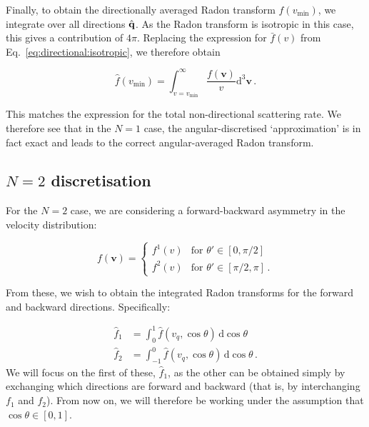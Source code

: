 Finally, to obtain the directionally averaged Radon transform $\hat{f}(v_\textrm{min})$, we integrate over all directions $\hat{\textbf{q}}$. As the Radon transform is isotropic in this case, this gives a contribution of $4\pi$. Replacing the expression for $\bar{f}(v)$ from Eq.~\ref{eq:directional:isotropic}, we therefore obtain

\begin{equation}
\hat{f}\left(v_\textrm{min}\right) = \int_{v=v_\textrm{min}}^\infty \frac{f(\textbf{v})}{v} \mathrm{d}^3\textbf{v}\,.
\end{equation}

This matches the expression for the total non-directional scattering rate. We therefore see that in the $N=1$ case, the angular-discretised `approximation' is in fact exact and leads to the correct angular-averaged Radon transform.


\subsection{$N=2$ discretisation}


For the $N=2$ case, we are considering a forward-backward asymmetry in the velocity distribution:

\begin{equation}
\label{eq:directional:N2}
f(\mathbf{v}) =
\begin{cases}
f^1(v) & \textrm{for } \theta' \in [0, \pi/2] \\
f^2(v) & \textrm{for } \theta' \in [\pi/2, \pi]\,.
\end{cases}
\end{equation}

From these, we wish to obtain the integrated Radon transforms for the forward and backward directions. Specifically:

\begin{align}
\hat{f}_1 &= \int_{0}^1 \hat{f}(v_q,\cos\theta) \, \mathrm{d}\cos\theta \\
\hat{f}_2 &= \int_{-1}^0 \hat{f}(v_q, \cos\theta) \, \mathrm{d}\cos\theta \,.
\end{align}
We will focus on the first of these, $\hat{f}_1$, as the other can be obtained simply by exchanging which directions are forward and backward (that is, by interchanging $f_1$ and $f_2$). From now on, we will therefore be working under the assumption that $\cos\theta \in [0,1]$.

